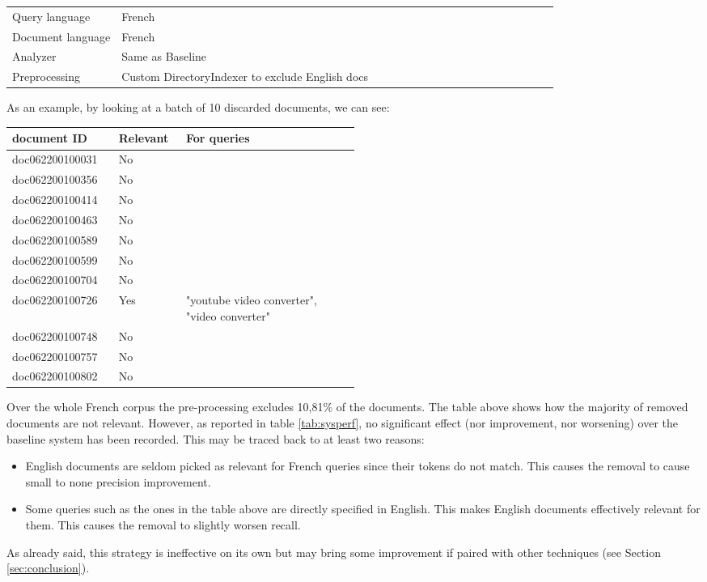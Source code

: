 \begin{table}[h!]
    \centering
    \begin{tabular}{l p{0.8\linewidth}}
    Query language & French\\
    Document language & French\\
    Analyzer & Same as Baseline\\
    Preprocessing & Custom DirectoryIndexer to exclude English docs
    \end{tabular}
\end{table}
As an example, by looking at a batch of 10 discarded documents, we can see:
\begin{table}[h!]
  \centering
  \begin{tabular}{|l|l|p{0.5\linewidth}|}
    \toprule
    document ID&Relevant&For queries\\
    \midrule
    doc062200100031&No&\\
    doc062200100356&No&\\
    doc062200100414&No&\\
    doc062200100463&No&\\
    doc062200100589&No&\\
    doc062200100599&No&\\
    doc062200100704&No&\\
    doc062200100726&Yes&"youtube video converter", "video converter" \\
    doc062200100748&No&\\
    doc062200100757&No&\\
    doc062200100802&No&\\
  \bottomrule
\end{tabular}
\end{table}
\par Over the whole French corpus the pre-processing excludes 10,81\% of the documents. The table above shows how the majority of removed documents are not relevant. However, as reported in table \ref{tab:sysperf}, no significant effect (nor improvement, nor worsening) over the baseline system has been recorded. This may be traced back to at least two reasons:
\begin{itemize}
    \item English documents are seldom picked as relevant for French queries since their tokens do not match. This causes the removal to cause small to none precision improvement.
    \item Some queries such as the ones in the table above are directly specified in English. This makes English documents effectively relevant for them. This causes the removal to slightly worsen recall.
\end{itemize}
As already said, this strategy is ineffective on its own but may bring some improvement if paired with other techniques (see Section \ref{sec:conclusion}).
